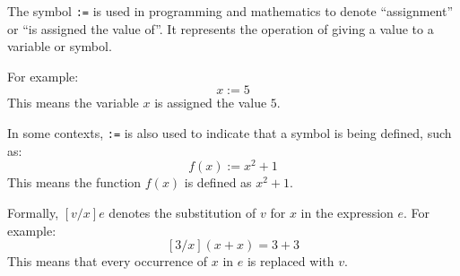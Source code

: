 \newpage







\begin{Def}[Symbol ``\texttt{:=}'']

    The symbol \texttt{:=} is used in programming and mathematics to denote ``assignment'' or ``is assigned the value of''. 
    It represents the operation of giving a value to a variable or symbol.

    \vspace{1em}
    \noindent
    For example:
    \[
    x := 5
    \]
    This means the variable $x$ is assigned the value $5$.

    \vspace{1em}
    \noindent
    In some contexts, \texttt{:=} is also used to indicate that a symbol is being defined, such as:
    \[
    f(x) := x^2 + 1
    \]
    This means the function $f(x)$ is defined as $x^2 + 1$.
\end{Def}

\begin{Def}
    
    \label{def:substitution}
    Formally, $[v/x]e$ denotes the substitution of $v$ for $x$ in the expression $e$.
    For example:
    \[
    [3/x](x + x) = 3 + 3
    \]
    This means that every occurrence of $x$ in $e$ is replaced with $v$.
\end{Def}



